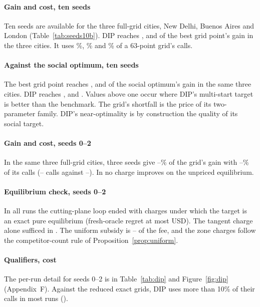\documentclass[preprint,12pt]{elsarticle}
\theoremstyle{definition}
\theoremstyle{remark}
\begin{document}
\paragraph{Gain and cost, ten seeds} Ten seeds are available for the three full-grid cities, New Delhi, Buenos Aires and London (Table~\ref{tab:seeds10b}). DIP reaches \TenDipGridNewDelhi, \TenDipGridBuenosAires{} and \TenDipGridLondon{} of the best grid point's gain in the three cities. It uses \TenDipCallsNewDelhi\%, \TenDipCallsBuenosAires\% and \TenDipCallsLondon\% of a 63-point grid's calls.

\paragraph{Against the social optimum, ten seeds} The best grid point reaches \TenSoGridNewDelhi, \TenSoGridBuenosAires{} and \TenSoGridLondon{} of the social optimum's gain in the same three cities. DIP reaches \TenSoDipNewDelhi, \TenSoDipBuenosAires{} and \TenSoDipLondon. Values above one occur where DIP's multi-start target is better than the benchmark. The grid's shortfall is the price of its two-parameter family. DIP's near-optimality is by construction the quality of its social target.

\paragraph{Gain and cost, seeds 0--2} In the same three full-grid cities, three seeds give \DipFullGainMin--\DipFullGainMax\% of the grid's gain with \DipFullCallsMin--\DipFullCallsMax\% of its calls (\DipCallsFullMin--\DipCallsFullMax{} calls against \GridCallsFullMin--\GridCallsFullMax). In \DipNoGainCities{} no charge improves on the unpriced equilibrium.

\paragraph{Equilibrium check, seeds 0--2} In all \DipRuns{} runs the cutting-plane loop ended with charges under which the target is an exact pure equilibrium (fresh-oracle regret at most \DipRegretMax{} USD). The tangent charge alone sufficed in \DipTangentN. The uniform subsidy is \DipSubsMin--\DipSubsMax{} of the fee, and the zone charges follow the competitor-count rule of Proposition~\ref{prop:uniform}.

\paragraph{Qualifiers, cost} The per-run detail for seeds 0--2 is in Table~\ref{tab:dip} and Figure~\ref{fig:dip} (Appendix~F). Against the reduced exact grids, DIP uses more than 10\% of their calls in most runs (\DipRedCalls).
\end{document}
